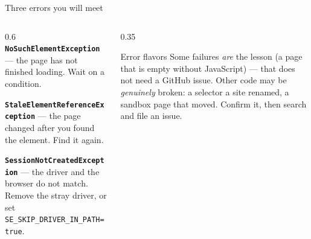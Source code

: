 \documentclass[9pt,aspectratio=169]{beamer}
\begin{document}
\begin{frame}{Three errors you will meet}
    \begin{columns}[T]
        \begin{column}{0.6\textwidth}
            \textbf{\texttt{NoSuchElementException}} --- the page has not finished loading. Wait on a condition.

            \medskip
            \textbf{\texttt{StaleElementReferenceException}} --- the page changed after you found the element. Find it again.

            \medskip
            \textbf{\texttt{SessionNotCreatedException}} --- the driver and the browser do not match. Remove the stray driver, or set \texttt{SE\_SKIP\_DRIVER\_IN\_PATH=true}.
        \end{column}
        \begin{column}{0.35\textwidth}
            \begin{alertblock}{Error flavors}
                \footnotesize Some failures \textit{are} the lesson (a page that is empty without JavaScript) --- that does not need a GitHub issue. Other code may be \textit{genuinely} broken: a selector a site renamed, a sandbox page that moved. Confirm it, then search and file an issue.
            \end{alertblock}
        \end{column}
    \end{columns}
\end{frame}
\end{document}
